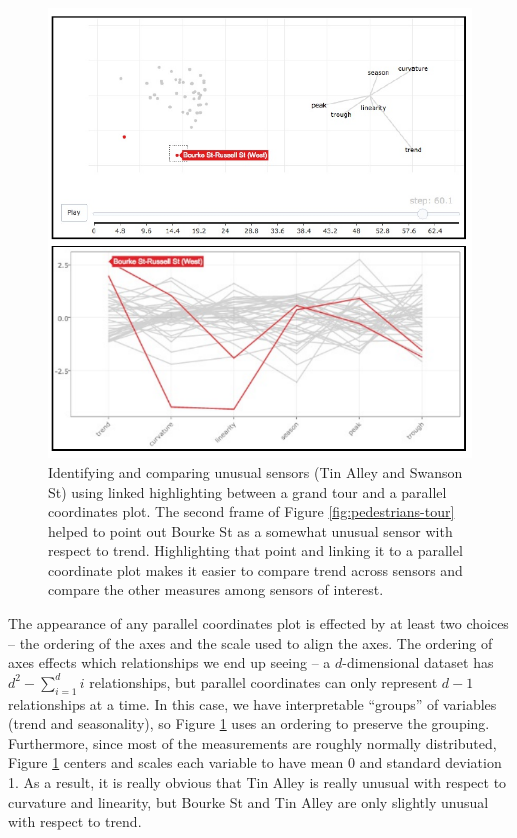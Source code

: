 \documentclass[12pt,]{article}
\theoremstyle{definition}
\theoremstyle{definition}
\theoremstyle{remark}
\begin{document}
\begin{figure}
\centering
\includegraphics{images/pedestrians-tour-pcp.pdf}
\caption{\label{fig:pedestrians-tour-pcp}Identifying and comparing unusual
sensors (Tin Alley and Swanson St) using linked highlighting between a
grand tour and a parallel coordinates plot. The second frame of Figure
\ref{fig:pedestrians-tour} helped to point out Bourke St as a somewhat
unusual sensor with respect to trend. Highlighting that point and
linking it to a parallel coordinate plot makes it easier to compare
trend across sensors and compare the other measures among sensors of
interest.}
\end{figure}

The appearance of any parallel coordinates plot is effected by at least
two choices -- the ordering of the axes and the scale used to align the
axes. The ordering of axes effects which relationships we end up seeing
-- a \(d\)-dimensional dataset has \(d^2 - \sum_{i=1}^d i\)
relationships, but parallel coordinates can only represent \(d-1\)
relationships at a time. In this case, we have interpretable ``groups''
of variables (trend and seasonality), so Figure
\ref{fig:pedestrians-tour-pcp} uses an ordering to preserve the
grouping. Furthermore, since most of the measurements are roughly
normally distributed, Figure \ref{fig:pedestrians-tour-pcp} centers and
scales each variable to have mean 0 and standard deviation 1. As a
result, it is really obvious that Tin Alley is really unusual with
respect to curvature and linearity, but Bourke St and Tin Alley are only
slightly unusual with respect to trend.
\end{document}
